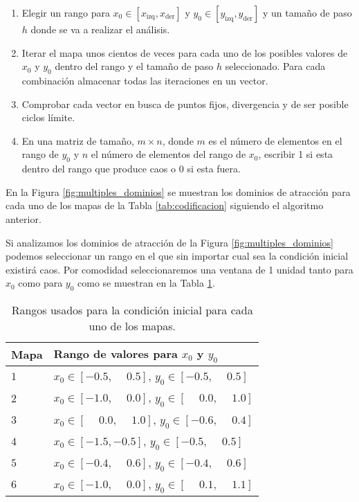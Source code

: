         \begin{enumerate}
            \item Elegir un rango para $x_{0} \in [x_{\text{izq}}, x_{\text{der}}]$ y $y_{0} \in [y_{\text{izq}}, y_{\text{der}}]$ y un tamaño de paso $h$ donde se va a realizar el análisis.
            \item Iterar el mapa unos cientos de veces para cada uno de los posibles valores de $x_{0}$ y $y_{0}$ dentro del rango y el tamaño de paso $h$ seleccionado. Para cada combinación almacenar todas las iteraciones en un vector.
            \item Comprobar cada vector en busca de puntos fijos, divergencia y de ser posible ciclos límite.
            \item En una matriz de tamaño, $m \times n$, donde $m$ es el número de elementos en el rango de $y_{0}$ y $n$ el número de elementos del rango de $x_{0}$, escribir 1 si esta dentro del rango que produce caos o $0$ si esta fuera.
        \end{enumerate}

       En la Figura \ref{fig:multiples_dominios} se muestran los dominios de atracción para cada uno de los mapas de la Tabla \ref{tab:codificacion} siguiendo el algoritmo anterior.

       Si analizamos los dominios de atracción de la Figura \ref{fig:multiples_dominios} podemos seleccionar un rango en el que sin importar cual sea la condición inicial existirá caos. Por comodidad seleccionaremos una ventana de 1 unidad tanto para $x_{0}$ como para $y_{0}$ como se muestran en la Tabla \ref{tab:rangos_mapas}. 

        \begin{table}[htbp]
            \centering
            \caption{Rangos usados para la condición inicial para cada uno de los mapas.}
            \begin{tabular}{|l|l|}
                \hline
                \rowcolor{lightgray} Mapa  & Rango de valores para $x_{0}$ y $y_{0}$ \\
                \hline
                $1$  & $x_{0} \in [-0.5, \phantom{-} 0.5]$, $y_{0} \in [-0.5, \phantom{-}0.5]$ \\
                \hline
                $2$  & $x_{0} \in [-1.0, \phantom{-} 0.0]$, $y_{0} \in [\phantom{-}0.0, \phantom{-}1.0]$ \\
                \hline
                $3$  & $x_{0} \in [\phantom{-}0.0, \phantom{-} 1.0]$, $y_{0} \in [-0.6, \phantom{-}0.4]$ \\
                \hline
                $4$  & $x_{0} \in [-1.5, -0.5]$, $y_{0} \in [-0.5, \phantom{-}0.5]$ \\
                \hline
                $5$  & $x_{0} \in [-0.4, \phantom{-}0.6]$, $y_{0} \in [-0.4, \phantom{-}0.6]$ \\
                \hline
                $6$  & $x_{0} \in [-1.0, \phantom{-}0.0]$, $y_{0} \in [\phantom{-}0.1, \phantom{-}1.1]$ \\
                \hline
            \end{tabular}
            \label{tab:rangos_mapas}
        \end{table}


